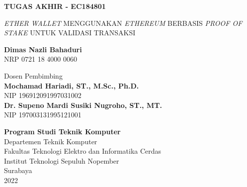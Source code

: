 \begin{flushleft}
  \fontsize{14pt}{17}
  \selectfont
  \textbf{TUGAS AKHIR - EC184801}
\end{flushleft}

\vspace{5ex}

\begin{flushleft}
  \fontsize{18pt}{22}
  \selectfont
  \emph{ETHER WALLET} MENGGUNAKAN \emph{ETHEREUM} BERBASIS \emph{PROOF OF STAKE} UNTUK VALIDASI TRANSAKSI
\end{flushleft}

\vspace{6ex}

\begin{flushleft}
  \fontsize{14pt}{17}
  \selectfont
  \textbf{Dimas Nazli Bahaduri}
  \\
  NRP 0721 18 4000 0060
\end{flushleft}

\vspace{6ex}

\begin{flushleft}
  \fontsize{14pt}{17}
  \selectfont
  Dosen Pembimbing \\
  \textbf{Mochamad Hariadi, ST., M.Sc., Ph.D.} \\ 
  NIP 196912091997031002 \\
 \textbf{Dr. Supeno Mardi Susiki Nugroho, ST., MT.} \\
  NIP 197003131995121001 \\
\end{flushleft}

\vspace{6ex}

\begin{flushleft}
  \fontsize{12pt}{15}
  \selectfont
  \textbf{Program Studi Teknik Komputer}\\
  Departemen Teknik Komputer\\
  Fakultas Teknologi Elektro dan Informatika Cerdas\\
  Institut Teknologi Sepuluh Nopember\\
  Surabaya\\
  2022
\end{flushleft}
